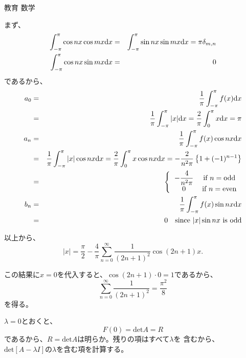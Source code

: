 \documentclass[fleqn]{jbook}
\begin{document}
\begin{answer}{教育 数学}{}
\begin{subanswers}
\begin{subsubanswers}
まず、
\begin{eqnarray*}
\int_{-\pi}^{\pi} \cos n x \cos m x {\rm d}x &=& \int_{-\pi}^{\pi} \sin nx
\sin mx {\rm d}x = \pi \delta_{m,n} \\
\int_{-\pi}^{\pi} \cos n x \sin m x {\rm d}x &=& 0
\end{eqnarray*}
であるから、
\begin{eqnarray*}
a_0 &=& \frac{1}{\pi} \int_{-\pi}^{\pi} f(x) \d x \\
&=& \frac{1}{\pi} \int_{-\pi}^{\pi} | x | \d x = \frac{2}{\pi} \int_{0}^{\pi}
x \d x = \pi \\
a_n &=& \frac{1}{\pi} \int_{-\pi}^{\pi} f(x) \cos n x \d x \\
&=& \frac{1}{\pi} \int_{-\pi}^{\pi} |x| \cos n x \d x = \frac{2}{\pi}
\int_{0}^{\pi} x \cos nx \d x= - \frac{2}{n^2 \pi} \left\{ 1 + (-1)^{n-1}
\right\} \\
&=& \left\{
\begin{tabular}{cc}
$\displaystyle{-\frac{4}{n^2 \pi}}$ & if $n=\mbox{odd}$ \\
 0  & if $n=\mbox{even}$\\
\end{tabular} \right. \\
b_n &=& \frac{1}{\pi} \int_{-\pi}^{\pi} f(x) \sin n x \d x \\
&=& 0 \quad \mbox{since  } |x| \sin nx \mbox{  is odd}
\end{eqnarray*}

以上から、
\[ |x| = \frac{\pi}{2} - \frac{4}{\pi} \sum_{n=0}^{\infty} \frac{1}{(2n+1)^2}
\cos (2n+1) x.\]



この結果に$x=0$を代入すると、$\cos(2n+1)\cdot 0 = 1$であるから、
\[ \sum_{n=0}^{\infty} \frac{1}{(2n+1)^2} = \frac{\pi ^2}{8}\]
を得る。

\end{subsubanswers}

\SubAnswer
\begin{subsubanswers}
\SubSubAnswer
$\lambda=0$とおくと、
\[F(0) = \mbox{det} A = R\]
であるから、$R=\mbox{det} A$は明らか。残りの項はすべて$\lambda$を
含むから、
$\mbox{det} \left[ A - \lambda I \right]$の$\lambda$を含む項を計算する。


\end{subsubanswers}
\end{subanswers}
\end{answer}
\end{document}
